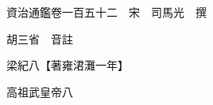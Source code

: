 










 


 
 


 

  
  
  
  
  





  
  
  
  
  
 
  

  

  
  
  



  

 
 

  
   




  

  
  


  　　資治通鑑卷一百五十二　宋　司馬光　撰

　　胡三省　音註

　　梁紀八【著雍涒灘一年】

　　高祖武皇帝八

